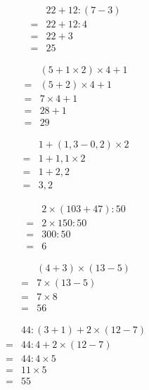 \begin{multicols}{3}
  \begin{align*}
    &22+12:(7-3)\\
    =&22+12:4\\
    =&22+3\\
    =&25
  \end{align*}
  \vspace{1em}

  \begin{align*}
    &(5+1\times 2)\times 4+1\\
    =&(5+2)\times 4+1\\
    =&7\times 4+1\\
    =&28+1\\
    =&29
  \end{align*}

  \begin{align*}
    &1+(1,3-0,2)\times 2\\
    =&1+1,1\times 2\\
    =&1+2,2\\
    =&3,2
  \end{align*}
  \vspace{1em}
\end{multicols}

\separe

\begin{multicols}{3}
  \begin{align*}
    &2\times (103+47):50\\
    =&2\times 150:50\\
    =&300:50\\
    =&6
  \end{align*}
  \vspace{1em}

  \begin{align*}
    &(4+3)\times (13-5)\\
    =&7\times (13-5)\\
    =&7\times 8\\
    =&56
  \end{align*}
  \vspace{1em}

  \begin{align*}
    &44:(3+1)+2\times (12-7)\\
    =&44:4+2\times (12-7)\\
    =&44:4\times 5\\
    =&11\times 5\\
    =&55
  \end{align*}
\end{multicols}

